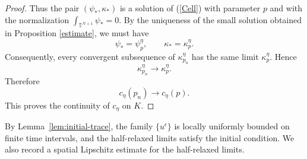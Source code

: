 \documentclass[preprint]{elsarticle}
\numberwithin{equation}{section}
\begin{document}
\begin{proof}
Thus the pair
$
(\psi_*,\kappa_*)
$
is a solution of (\ref{Cell}) with parameter $p$ and with the normalization
$
\int_{\mathbb T^{N+1}}\psi_*=0.
$
By the uniqueness of the small solution obtained in Proposition \ref{estimate}, we must have
\begin{equation*}
\psi_*=\psi_p^\eta,
\qquad
\kappa_*=\kappa_p^\eta.
\end{equation*}
Consequently, every convergent subsequence of $\kappa_{p_n}^\eta$ has the same limit $\kappa_p^\eta$. Hence
\begin{equation*}
\kappa_{p_n}^\eta\to\kappa_p^\eta.
\end{equation*}
Therefore
\begin{equation*}
c_\eta(p_n)\to c_\eta(p).
\end{equation*}
This proves the continuity of $c_\eta$ on $K$.
\end{proof}
By Lemma~\ref{lem:initial-trace}, the family $\{u^\epsilon\}$ is locally uniformly bounded on finite time intervals, and the half-relaxed limits satisfy the initial condition. We also record a spatial Lipschitz estimate for the half-relaxed limits.
\end{document}
